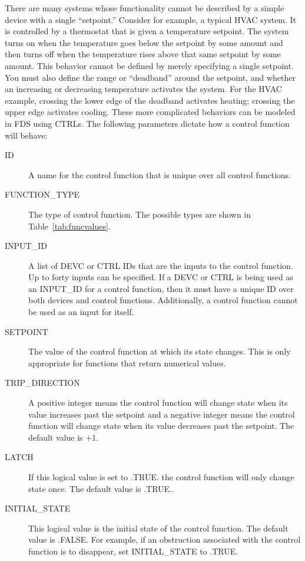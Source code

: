 \documentclass[11pt]{book}
\begin{document}
There are many systems whose functionality cannot be described by a simple device with a single ``setpoint.''
Consider for example, a typical HVAC system.  It is controlled by a thermostat that is given a temperature setpoint.
The system turns on when the temperature goes below the setpoint by some
amount and then turns off when the temperature rises above that same setpoint by some amount.
This behavior cannot be defined by merely specifying a single setpoint.
You must also define the range or ``deadband'' around the setpoint, and whether an
increasing or decreasing temperature activates the system.  For the HVAC example, crossing the
lower edge of the deadband activates heating; crossing the upper edge activates cooling.  These more complicated behaviors can be modeled in FDS using {\ct CTRL}s.  The following parameters dictate how a control function will behave:
\begin{description}
\item[{\ct ID}] A name for the control function that is unique over all control functions.
\item[{\ct FUNCTION\_TYPE}] The type of control function.  The possible types are shown in Table~\ref{tab:funcvalues}.
\item[{\ct INPUT\_ID}] A list of {\ct DEVC} or {\ct CTRL} {\ct ID}s that are the inputs to the control function.  Up to forty inputs can be specified.  If a {\ct DEVC} or {\ct CTRL} is being used as an {\ct INPUT\_ID} for a control function, then it must have a unique {\ct ID} over both devices and control functions.  Additionally, a control function cannot be used as an input for itself.
\item[{\ct SETPOINT}] The value of the control function at which its state changes. This is only appropriate for functions that return numerical values.
\item[{\ct TRIP\_DIRECTION}] A positive integer means the control function will change state when its value increases
past the setpoint and a negative integer means the control function will change state
when its value decreases past the setpoint.  The default value is +1.
\item[{\ct LATCH}] If this logical value is set to {\ct .TRUE.} the control function will only change state once.
The default value is {\ct .TRUE.}.
\item[{\ct INITIAL\_STATE}] This logical value is the initial state of the control function. The default value
is {\ct .FALSE.} For example, if an obstruction associated with the control function is to disappear, set {\ct INITIAL\_STATE} to {\ct .TRUE.}
\end{description}
\end{document}
